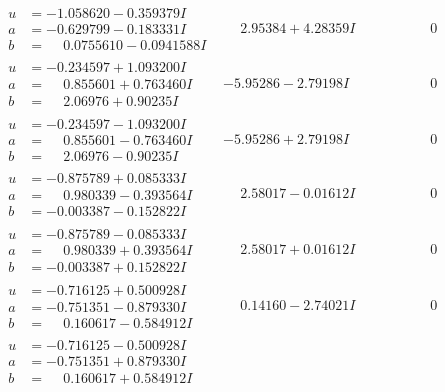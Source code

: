 \documentclass[1p]{elsarticle_modified}
\theoremstyle{definition}
\begin{document}
$$\begin{array}{c|c|c}
\begin{aligned}
u &= -1.058620 - 0.359379 I \\
a &= -0.629799 - 0.183331 I \\
b &= \phantom{-}0.0755610 - 0.0941588 I\end{aligned}
 & \phantom{-}2.95384 + 4.28359 I & \phantom{-0.000000 } 0 \\ \hline\begin{aligned}
u &= -0.234597 + 1.093200 I \\
a &= \phantom{-}0.855601 + 0.763460 I \\
b &= \phantom{-}2.06976 + 0.90235 I\end{aligned}
 & -5.95286 - 2.79198 I & \phantom{-0.000000 } 0 \\ \hline\begin{aligned}
u &= -0.234597 - 1.093200 I \\
a &= \phantom{-}0.855601 - 0.763460 I \\
b &= \phantom{-}2.06976 - 0.90235 I\end{aligned}
 & -5.95286 + 2.79198 I & \phantom{-0.000000 } 0 \\ \hline\begin{aligned}
u &= -0.875789 + 0.085333 I \\
a &= \phantom{-}0.980339 - 0.393564 I \\
b &= -0.003387 - 0.152822 I\end{aligned}
 & \phantom{-}2.58017 - 0.01612 I & \phantom{-0.000000 } 0 \\ \hline\begin{aligned}
u &= -0.875789 - 0.085333 I \\
a &= \phantom{-}0.980339 + 0.393564 I \\
b &= -0.003387 + 0.152822 I\end{aligned}
 & \phantom{-}2.58017 + 0.01612 I & \phantom{-0.000000 } 0 \\ \hline\begin{aligned}
u &= -0.716125 + 0.500928 I \\
a &= -0.751351 - 0.879330 I \\
b &= \phantom{-}0.160617 - 0.584912 I\end{aligned}
 & \phantom{-}0.14160 - 2.74021 I & \phantom{-0.000000 } 0 \\ \hline\begin{aligned}
u &= -0.716125 - 0.500928 I \\
a &= -0.751351 + 0.879330 I \\
b &= \phantom{-}0.160617 + 0.584912 I\end{aligned}

\end{array}$$
\end{document}
